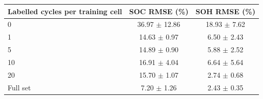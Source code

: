 \begin{tabular}{lcc}
\toprule
Labelled cycles per training cell & SOC RMSE (\%) & SOH RMSE (\%) \\
\midrule
0 & 36.97 $\pm$ 12.86 & 18.93 $\pm$ 7.62 \\
1 & 14.63 $\pm$ 0.97 & 6.50 $\pm$ 2.43 \\
5 & 14.89 $\pm$ 0.90 & 5.88 $\pm$ 2.52 \\
10 & 16.91 $\pm$ 4.04 & 6.64 $\pm$ 5.64 \\
20 & 15.70 $\pm$ 1.07 & 2.74 $\pm$ 0.68 \\
Full set & 7.20 $\pm$ 1.26 & 2.43 $\pm$ 0.35 \\
\bottomrule
\end{tabular}
